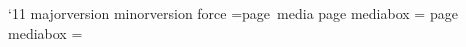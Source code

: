 \catcode`\@11\relax
\def\@firstoftwo#1#2{#1}
\def\@secondoftwo#1#2{#2}
\ifdefined\XeTeXversion
\else
  \ifdefined\luatexversion
    \def\pdfmajorversion{\pdfvariable majorversion}%
    \def\pdfminorversion{\pdfvariable minorversion}%
  \fi
  \ifdefined\mmzpdfmajorversion
    \pdfmajorversion\mmzpdfmajorversion\relax
  \fi
  \ifdefined\mmzpdfminorversion
    \pdfminorversion\mmzpdfminorversion\relax
  \fi
\fi
\newwrite\extractionlog
\ifdefined\logfile
  \immediate\openout\extractionlog{\logfile}%
  \def\doublewarning#1{%
    \message{#1}%
    \def\warningtext{#1}%
    \immediate\write\extractionlog{%
      \ifdefined\warningtemplate\warningtemplate\else\warningtext\fi
    }%
  }%
\else
  \let\doublewarning\message
\fi
\newif\ifforce
\ifdefined\force
  \csname force\force\endcsname
\fi
\def\mmz@tolerance{0.01pt}
\def\mmz@if@roughly@equal#1#2#3{%
  \dimen0=\dimexpr#2-#3\relax
  \ifdim\dimen0<0pt
    \dimen0=-\dimen0\relax
  \fi
  \ifdim\dimen0>#1\relax
    \expandafter\@secondoftwo
  \else
    \expandafter\@firstoftwo
  \fi
}%
\ifdefined\XeTeXversion
  =\hbox{\XeTeXpdffile \fromdocument\space page \pagenumber media}%
\else
  \ifdefined\luatexversion
    \saveimageresource page \pagenumber mediabox {\fromdocument}%
    =\hbox{\useimageresource\lastsavedimageresourceindex}%
  \else
    \pdfximage page \pagenumber mediabox {\fromdocument}%
    =\hbox{\pdfrefximage\pdflastximage}%
  \fi
\fi
\newif\ifbaddimensions
\ifdefined\expectedwidth
